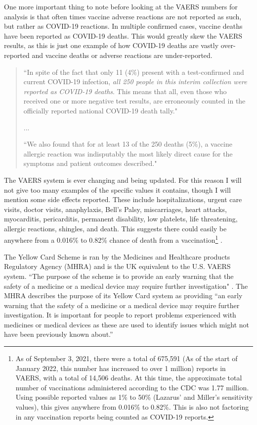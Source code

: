 \documentclass[10pt, a4paper, twocolumn]{book}
\begin{document}
One more important thing to note before looking at the VAERS numbers for analysis is that often times vaccine adverse reactions are not reported as such, but rather as COVID-19 reactions. In multiple confirmed cases, vaccine deaths have been reported as COVID-19 deaths. This would greatly skew the VAERS results, as this is just one example of how COVID-19 deaths are vastly over-reported and vaccine deaths or adverse reactions are under-reported.

\begin{quotation}
	``In spite of the fact that only 11 (4\%) present with a test-confirmed and current COVID-19 infection, \textit{all 250 people in this interim collection were reported as COVID-19 deaths}. This means that all, even those who received one or more negative test results, are erroneously counted in the officially reported national COVID-19 death tally." 
	
	...
	
	``We also found that for at least 13 of the 250 deaths (5\%), a	vaccine allergic reaction was indisputably the most likely direct cause for the symptoms and patient outcomes described." \citep{VAERSHealthCareReporters}
\end{quotation}

The VAERS system is ever changing and being updated. For this reason I will not give too many examples of the specific values it contains, though I will mention some side effects reported. These include hospitalizations, urgent care visits, doctor visits, anaphylaxis, Bell's Palsy, miscarriages, heart attacks, myocarditis, pericarditis, permanent disability, low platelets, life threatening, allergic reactions, shingles, and death. This suggests there could easily be anywhere from a 0.016\% to 0.82\% chance of death from a vaccination\footnote{As of September 3, 2021, there were a total of 675,591 (As of the start of January 2022, this number has increased to over 1 million) reports in VAERS, with a total of 14,506 deaths. At this time, the approximate total number of vaccinations administered according to the CDC was 1.77 million. Using possible reported values as 1\% to 50\% (Lazarus' and Miller's sensitivity values), this gives anywhere from 0.016\% to 0.82\%. This is also not factoring in any vaccination reports being counted as COVID-19 reports.} \citep{VAERS}.

The Yellow Card Scheme is ran by the Medicines and Healthcare products Regulatory Agency (MHRA) and is the UK equivalent to the U.S. VAERS system. ``The purpose of the scheme is to provide an early warning that the safety of a medicine or a medical device may require further investigation" \citep{YellowCardScheme}. The MHRA describes the purpose of its Yellow Card system as providing “an early warning that the safety of a medicine or a medical device may require further investigation. It is important for people to report problems experienced with medicines or medical devices as these are used to identify issues which might not have been previously known about.” \cite{YellowCard}
\end{document}
